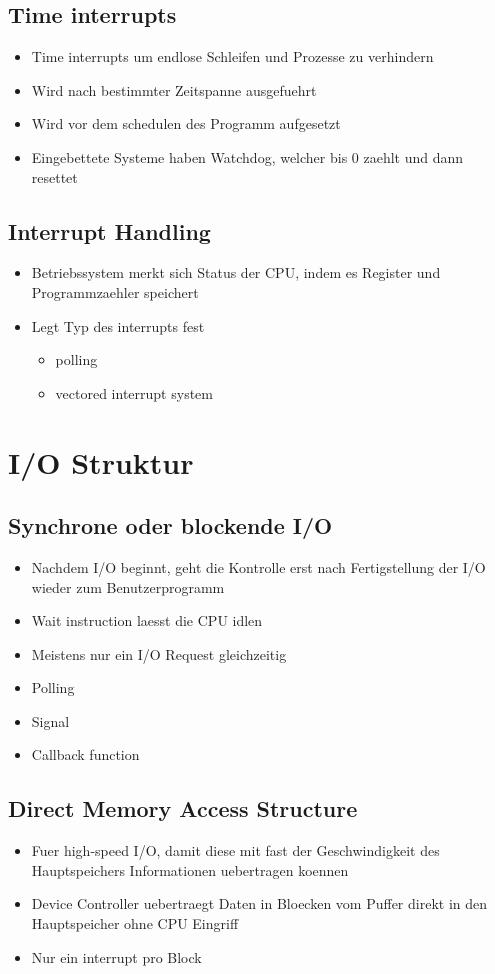 \documentclass[a4paper]{scrreprt}
\begin{document}
\subsection{Time interrupts}
\begin{itemize}
	\item Time interrupts um endlose Schleifen und Prozesse zu verhindern
	\item Wird nach bestimmter Zeitspanne ausgefuehrt
	\item Wird vor dem schedulen des Programm aufgesetzt
	\item Eingebettete Systeme haben Watchdog, welcher bis 0 zaehlt und dann resettet
\end{itemize}

\subsection{Interrupt Handling}
\begin{itemize}
	\item Betriebssystem merkt sich Status der CPU, indem es Register und Programmzaehler speichert
	\item Legt Typ des interrupts fest
		\begin{itemize}
			\item polling
			\item vectored interrupt system
		\end{itemize}
\end{itemize}

\section{I/O Struktur}
\subsection{Synchrone oder blockende I/O}
\begin{itemize}
	\item Nachdem I/O beginnt, geht die Kontrolle erst nach Fertigstellung der I/O wieder zum Benutzerprogramm
	\item Wait instruction laesst die CPU idlen
	\item Meistens nur ein I/O Request gleichzeitig
	\item Polling
	\item Signal
	\item Callback function
\end{itemize}

\subsection{Direct Memory Access Structure}
\begin{itemize}
	\item Fuer high-speed I/O, damit diese mit fast der Geschwindigkeit des Hauptspeichers Informationen uebertragen koennen
	\item Device Controller uebertraegt Daten in Bloecken vom Puffer direkt in den Hauptspeicher ohne CPU Eingriff
	\item Nur ein interrupt pro Block
\end{itemize}
\end{document}
